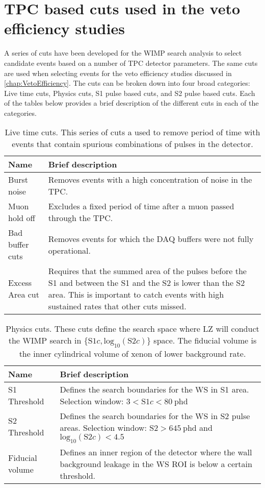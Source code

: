 \section{TPC based cuts used in the veto efficiency studies}\label{sec:app/WSCoreCuts}
A series of cuts have been developed for the WIMP search analysis to select candidate events based on a number of TPC detector parameters. The same cuts are used when selecting events for the veto efficiency studies discussed in \autoref{chap:VetoEfficiency}. The cuts can be broken down into four broad categories: Live time cuts, Physics cuts, S1 pulse based cuts, and S2 pulse based cuts. Each of the tables below provides a brief description of the different cuts in each of the categories.
\begin{table}[h!]
    \centering
    \caption[Live time cuts used in the veto efficiency studies.]{Live time cuts. This series of cuts a used to remove period of time with events that contain spurious combinations of pulses in the detector.}
    \begin{tabular}{|m{10em}m{29em}|}
    \hline
    \textbf{Name} & \textbf{Brief description} \\
    \hline\hline
    Burst noise & Removes events with a high concentration of noise in the TPC.\\
    \hline
    Muon hold off & Excludes a fixed period of time after a muon passed through the TPC.\\
    \hline
    Bad buffer cuts & Removes events for which the DAQ buffers were not fully operational.\\
    \hline
    Excess Area cut & Requires that the summed area of the pulses before the S1 and between the S1 and the S2 is lower than the S2 area. This is important to catch events with high sustained rates that other cuts missed.\\
    \hline
    \end{tabular}
\end{table}
\begin{table}[h!]
    \centering
    \caption[Physics cuts used in the veto efficiency studies.]{Physics cuts. These cuts define the search space where LZ will conduct the WIMP search in $\{\text{S1}c,\text{log}_{10}(\text{S2}c)\}$ space. The fiducial volume is the inner cylindrical volume of xenon of lower background rate.}
    \begin{tabular}{|m{10em}m{29em}|}
    \hline
    \textbf{Name}&\textbf{Brief description}\\
    \hline\hline
    S1 Threshold & Defines the search boundaries for the WS in S1 area. Selection window: $3<\text{S1}c<80~\text{phd}$ \\
    \hline
    S2 Threshold & Defines the search boundaries for the WS in S2 pulse areas. Selection window: $\text{S2}>645~\text{phd}$ and $\text{log}_{10}(\text{S2}c)<4.5$ \\
    \hline
    Fiducial volume & Defines an inner region of the detector where the wall background leakage in the WS ROI is below a certain threshold.\\
    \hline
    \end{tabular}
\end{table}
